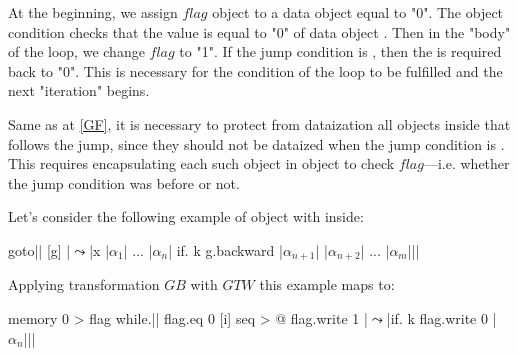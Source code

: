 \documentclass[sigplan,review,11pt,nonacm,natbib=false]{acmart}
\theoremstyle{theorems}
\begin{document}
At the beginning, we assign $flag$ object to a data object  equal to "0".
The  object condition checks that the  value is equal to "0" of data object .
Then in the "body" of the loop, we change $flag$ to "1".
If the jump condition is , then the  is required back to "0".
This is necessary for the condition of the loop to be fulfilled and the next "iteration" begins.

Same as at \ref{GF}, it is necessary to protect from dataization all objects inside  that follows the jump, since they should not be dataized when the jump condition is .
This requires encapsulating each such object in object  to check $flag$---i.e. whether the jump condition was  before or not.

Let's consider the following example of object  with  inside:
\begin{ffcode}
goto|$\label{ln:GB0}$|
  [g]
   |$\leadsto$|x
      |$\alpha_1$|
      ...
      |$\alpha_n$|
      if.
        k
        g.backward
        |$\alpha_{n+1}$|
      |$\alpha_{n+2}$|
      ...
      |$\alpha_{m}$||$\label{ln:GB1}$|
\end{ffcode}
Applying transformation $GB$ with $GTW$ this example maps to:
\begin{ffcode}
memory 0 > flag
while.|$\label{ln:TGB0}$|
  flag.eq 0
  [i]
    seq > @
      flag.write 1
       |$\leadsto$|if.
          k
          flag.write 0
          |$\alpha_{n}$||$\label{ln:TGB1}$|
\end{ffcode}
\end{document}
